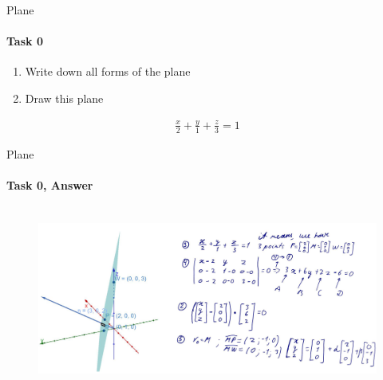 \documentclass[aspectratio=169]{beamer}
\begin{document}
\begin{frame}[t]{Plane}
    \framesubtitle{Task 0}
    \begin{minipage}{0.49\textwidth}
        \begin{enumerate}
            \item Write down all forms of the plane
            \item Draw this plane
        \end{enumerate}

    \end{minipage}
    \begin{minipage}{0.5\textwidth}
        \begin{align*}
            \frac{x}{2}+\frac{y}{1}+\frac{z}{3}=1
        \end{align*}
    \end{minipage}
\end{frame}

\begin{frame}[t]{Plane}
    \framesubtitle{Task 0, Answer}
    \vspace{-0.6cm}
    \begin{figure}[H]
        \href{https://www.geogebra.org/m/rxduxkwn}{
            \centering\includegraphics[height=6cm,width=1\textwidth,keepaspectratio]{plane_ans.png}}
        \label{fig:plane_ans.png}
    \end{figure}
\end{frame}
\end{document}
